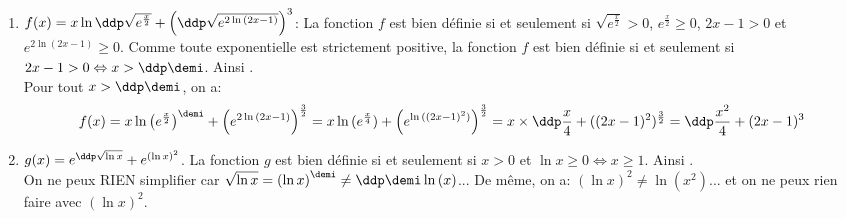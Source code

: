 \begin{correction}  \;
\begin{enumerate}
 \item
$f(x)=x\ln{\ddp\sqrt{e^{\frac{x}{2}}}}+\left( \ddp\sqrt{e^{2\ln{(2x-1)}}} \right)^3$: La fonction $f$ est bien d\'efinie si et seulement si $\sqrt{e^{\frac{x}{2}}}>0$, $e^{\frac{x}{2}}\geq 0$, $2x-1>0$ et $e^{2\ln{(2x-1)}}\geq 0$. Comme toute exponentielle est strictement positive, la fonction $f$ est bien d\'efinie si et seulement si $2x-1>0\Leftrightarrow x>\ddp\demi$. Ainsi .\\
\noindent  Pour tout $x>\ddp\demi$, on a: 
$$f(x)=x\ln{  \left( e^{\frac{x}{2}} \right)^{\demi} } + \left( e^{2\ln{(2x-1)}}\right)^{\frac{3}{2}}= x\ln{( e^{\frac{x}{4}} )}  +  \left( e^{\ln{((2x-1)^2)}}\right)^{\frac{3}{2}}= x\times \ddp\frac{x}{4}+ ((2x-1)^2)^{\frac{3}{2}}= \ddp\frac{x^2}{4}+(2x-1)^3$$
\item 
$g(x)=e^{\ddp\sqrt{\ln{x}}}+e^{(\ln{x})^2}$. La fonction $g$ est bien d\'efinie si et seulement si $x>0$ et $\ln{x}\geq 0\Leftrightarrow x\geq 1$. Ainsi .\\
\noindent On ne peux RIEN simplifier car $\sqrt{\ln{x}}=\left( \ln{x} \right)^{\demi}\not= \ddp\demi\ln{(x)}$... De m\^{e}me, on a: $(\ln{x})^2\not= \ln{(x^2)}$... et on ne peux rien faire avec $(\ln{x})^2$.
\end{enumerate}
\end{correction}